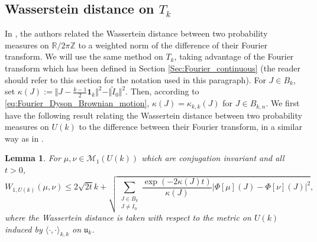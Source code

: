 \documentclass[10pt,11pt]{amsart}%
\newtheorem{lemma}[theorem]{Lemma}
\begin{document}
\subsection{Wasserstein distance on $T_k$} 
In \cite{BobLed}, the authors related the Wassertein distance between two probability measures on $\mathbb{R}/2\pi\mathbb{Z}$ to a weighted norm of the difference of their Fourier transform. We will use the same method on $T_k$, taking advantage of the Fourier transform which has been defined in Section \ref{Sec:Fourier_continuous} (the reader should refer to this section for the notation used in this paragraph). For $J\in B_{k}$, set $\kappa(J):=\Vert J-\frac{k-1}{2}\mathbf{1}_k\Vert^2-\Vert \tilde{I}_0\Vert^2$. Then, according to \eqref{eq:Fourier_Dyson_Brownian_motion}, $\kappa(J)=\kappa_{k,k}(J)$ for $J\in B_{k,n}$. We first have the following result relating the Wassertein distance between two probability measures on $U(k)$ to the difference between their Fourier transform, in a similar way as in \cite{BobLed}.
\begin{lemma}
For $\mu,\nu\in\mathcal{M}_1( U(k))$ which are conjugation invariant and all $t>0$,
$$W_{1, U(k)}(\mu,\nu)\leq 2\sqrt{2t}k+\sqrt{\sum_{\substack{J\in B_{k}\\J\not=I_0}}\frac{\exp(-2\kappa(J)t)}{\kappa(J)}\left\vert \Phi[\mu](J)-\Phi[\nu](J)\right\vert^2},$$
where the Wassertein distance is taken with respect to the metric on $U(k)$ induced by $\langle \cdot,\cdot\rangle_{k,k}$ on $\mathfrak{u}_k$.
\end{lemma}
\end{document}
